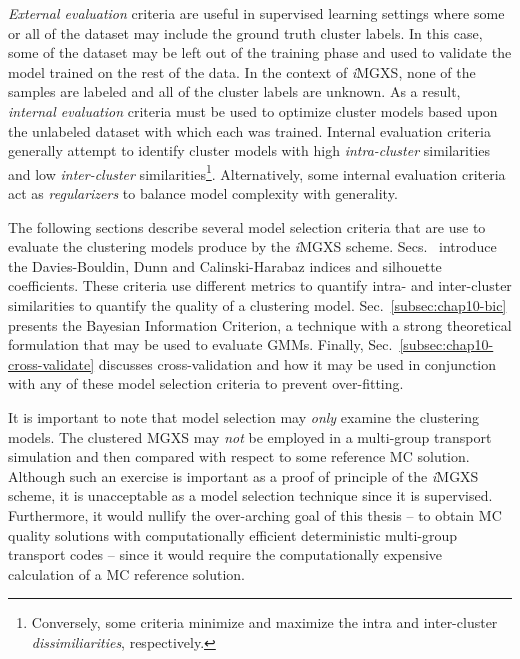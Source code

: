 \noindent \textit{External evaluation} criteria are useful in supervised learning settings where some or all of the dataset may include the ground truth cluster labels. In this case, some of the dataset may be left out of the training phase and used to validate the model trained on the rest of the data. In the context of \textit{i}\ac{MGXS}, none of the samples are labeled and all of the cluster labels are unknown. As a result, \textit{internal evaluation} criteria must be used to optimize cluster models based upon the unlabeled dataset with which each was trained. Internal evaluation criteria generally attempt to identify cluster models with high \textit{intra-cluster} similarities and low \textit{inter-cluster} similarities\footnote{Conversely, some criteria minimize and maximize the intra and inter-cluster \textit{dissimiliarities}, respectively.}. Alternatively, some internal evaluation criteria act as \textit{regularizers} to balance model complexity with generality.

The following sections describe several model selection criteria that are use to evaluate the clustering models produce by the \textit{i}\ac{MGXS} scheme. Secs.~ introduce the Davies-Bouldin, Dunn and Calinski-Harabaz indices and silhouette coefficients. These criteria use different metrics to quantify intra- and inter-cluster similarities to quantify the quality of a clustering model. Sec.~\ref{subsec:chap10-bic} presents the Bayesian Information Criterion, a technique with a strong theoretical formulation that may be used to evaluate \acp{GMM}. Finally, Sec.~\ref{subsec:chap10-cross-validate} discusses cross-validation and how it may be used in conjunction with any of these model selection criteria to prevent over-fitting.

It is important to note that model selection may \textit{only} examine the clustering models. The clustered \ac{MGXS} may \textit{not} be employed in a multi-group transport simulation and then compared with respect to some reference \ac{MC} solution. Although such an exercise is important as a proof of principle of the \textit{i}\ac{MGXS} scheme, it is unacceptable as a model selection technique since it is supervised. Furthermore, it would nullify the over-arching goal of this thesis -- to obtain \ac{MC} quality solutions with computationally efficient deterministic multi-group transport codes -- since it would require the computationally expensive calculation of a \ac{MC} reference solution.

